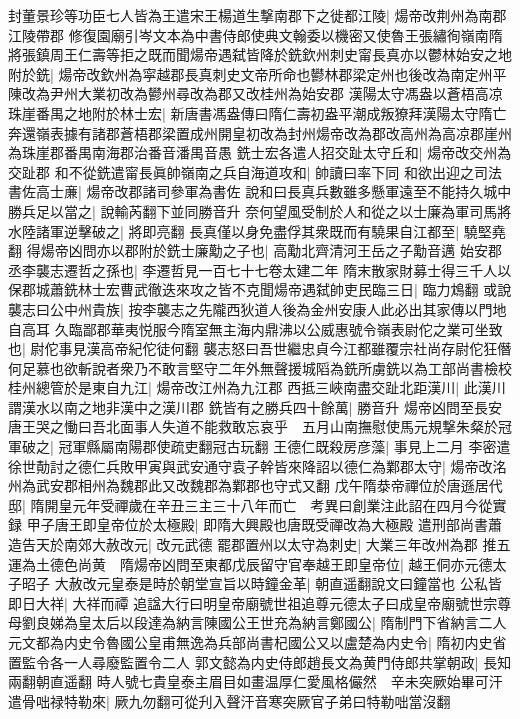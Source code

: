 封董景珍等功臣七人皆為王遣宋王楊道生撃南郡下之徙都江陵|{
	煬帝改荆州為南郡江陵帶郡}
修復園廟引岑文本為中書侍郎使典文翰委以機密又使魯王張繡徇嶺南隋將張鎮周王仁壽等拒之既而聞煬帝遇弑皆降於銑欽州刺史甯長真亦以鬱林始安之地附於銑|{
	煬帝改欽州為寜越郡長真刺史文帝所命也鬰林郡梁定州也後改為南定州平陳改為尹州大業初改為鬰州尋改為郡又改桂州為始安郡}
漢陽太守馮盎以蒼梧高凉珠崖番禺之地附於林士宏|{
	新唐書馮盎傳曰隋仁壽初盎平潮成叛獠拜漢陽太守隋亡奔還嶺表據有諸郡蒼梧郡梁置成州開皇初改為封州煬帝改為郡改高州為高凉郡崖州為珠崖郡番禺南海郡治番音潘禺音愚}
銑士宏各遣人招交趾太守丘和|{
	煬帝改交州為交趾郡}
和不從銑遣甯長眞帥嶺南之兵自海道攻和|{
	帥讀曰率下同}
和欲出迎之司法書佐高士亷|{
	煬帝改郡諸司參軍為書佐}
說和曰長真兵數雖多懸軍遠至不能持久城中勝兵足以當之|{
	說輸芮翻下並同勝音升}
奈何望風受制於人和從之以士廉為軍司馬將水陸諸軍逆擊破之|{
	將即亮翻}
長真僅以身免盡俘其衆既而有驍果自江都至|{
	驍堅堯翻}
得煬帝凶問亦以郡附於銑士廉勱之子也|{
	高勱北齊清河王岳之子勱音邁}
始安郡丞李襲志遷哲之孫也|{
	李遷哲見一百七十七卷太建二年}
隋末散家財募士得三千人以保郡城蕭銑林士宏曹武徹迭來攻之皆不克聞煬帝遇弑帥吏民臨三日|{
	臨力鴆翻}
或說襲志曰公中州貴族|{
	按李襲志之先隴西狄道人後為金州安康人此必出其家傳以門地自高耳}
久臨鄙郡華夷悦服今隋室無主海内鼎沸以公威惠號令嶺表尉佗之業可坐致也|{
	尉佗事見漢高帝紀佗徒何翻}
襲志怒曰吾世繼忠貞今江都雖覆宗社尚存尉佗狂僭何足慕也欲斬說者衆乃不敢言堅守二年外無聲援城䧟為銑所虜銑以為工部尚書檢校桂州總管於是東自九江|{
	煬帝改江州為九江郡}
西抵三峽南盡交趾北距漢川|{
	此漢川謂漢水以南之地非漢中之漢川郡}
銑皆有之勝兵四十餘萬|{
	勝音升}
煬帝凶問至長安唐王哭之慟曰吾北面事人失道不能救敢忘哀乎　五月山南撫慰使馬元規撃朱粲於冠軍破之|{
	冠軍縣屬南陽郡使疏吏翻冠古玩翻}
王德仁既殺房彦藻|{
	事見上二月}
李密遣徐世勣討之德仁兵敗甲寅與武安通守袁子幹皆來降詔以德仁為鄴郡太守|{
	煬帝改洺州為武安郡相州為魏郡此又改魏郡為鄴郡也守式又翻}
戊午隋㳟帝禪位於唐遜居代邸|{
	隋開皇元年受禪歲在辛丑三主三十八年而亡　考異曰創業注此詔在四月今從實録}
甲子唐王即皇帝位於太極殿|{
	即隋大興殿也唐既受禪改為大極殿}
遣刑部尚書蕭造告天於南郊大赦改元|{
	改元武德}
罷郡置州以太守為刺史|{
	大業三年改州為郡}
推五運為土德色尚黄　隋煬帝凶問至東都戊辰留守官奉越王即皇帝位|{
	越王侗亦元德太子昭子}
大赦改元皇泰是時於朝堂宣旨以時鐘金革|{
	朝直遥翻說文曰鐘當也}
公私皆即日大祥|{
	大祥而禫}
追諡大行曰明皇帝廟號世祖追尊元德太子曰成皇帝廟號世宗尊母劉良娣為皇太后以段達為納言陳國公王世充為納言鄭國公|{
	隋制門下省納言二人}
元文都為内史令魯國公皇甫無逸為兵部尚書杞國公又以盧楚為内史令|{
	隋初内史省置監令各一人尋廢監置令二人}
郭文懿為内史侍郎趙長文為黄門侍郎共掌朝政|{
	長知兩翻朝直遥翻}
時人號七貴皇泰主眉目如畫温厚仁愛風格儼然　辛未突厥始畢可汗遣骨咄禄特勒來|{
	厥九勿翻可從刋入聲汗音寒突厥官子弟曰特勒咄當沒翻}
